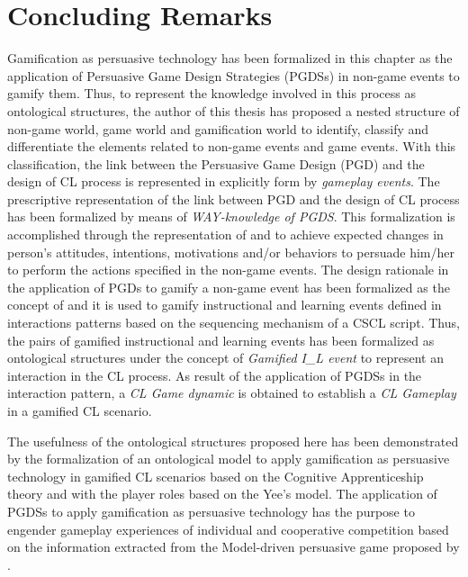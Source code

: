 \section{Concluding Remarks}
\label{sec:ontogacles2-concluding-remarks} 

Gamification as persuasive technology has been formalized in this chapter as the application of Persuasive Game Design Strategies (PGDSs) in non-game events to gamify them. Thus, to represent the knowledge involved in this process as ontological structures, the author of this thesis has proposed a nested structure of non-game world, game world and gamification world to identify, classify and differentiate the elements related to non-game events and game events. With this classification, the link between the Persuasive Game Design (PGD) and the design of CL process is represented in explicitly form by \emph{gameplay events}. The prescriptive representation of the link between PGD and the design of CL process has been formalized by means of \emph{WAY-knowledge of PGDS}. This formalization is accomplished through the representation of  and  to achieve expected changes in person's attitudes, intentions, motivations and/or behaviors to persuade him/her to perform the actions specified in the non-game events. The design rationale in the application of PGDs to gamify a non-game event has been formalized as the concept of  and it is used to gamify instructional and learning events defined in interactions patterns based on the sequencing mechanism of a CSCL script. Thus, the pairs of gamified instructional and learning events has been formalized as ontological structures under the concept of \emph{Gamified I\_L event} to represent an interaction in the CL process. As result of the application of PGDSs in the interaction pattern, a \emph{CL Game dynamic} is obtained to establish a \emph{CL Gameplay} in a gamified CL scenario. 

The usefulness of the ontological structures proposed here has been demonstrated by the formalization of an ontological model to apply gamification as persuasive technology in gamified CL scenarios based on the Cognitive Apprenticeship theory and with the player roles based on the Yee's model. The application of PGDSs to apply gamification as persuasive technology has the purpose to engender gameplay experiences of individual and cooperative competition based on the information extracted from the Model-driven persuasive game proposed by . 

